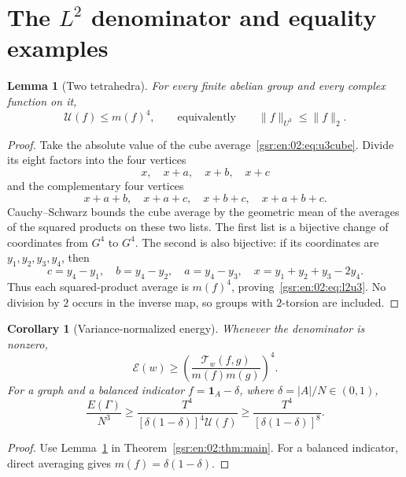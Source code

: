 \documentclass[11pt,letterpaper]{article}
\numberwithin{equation}{section}
\newtheorem{lemma}[theorem]{Lemma}
\newtheorem{corollary}[theorem]{Corollary}
\theoremstyle{definition}
\theoremstyle{remark}
\newcommand{\one}{\mathbf 1}
\newcommand{\1}{\mathbf 1}
\newcommand{\U}{\mathcal U}
\newcommand{\calE}{\mathcal E}
\newcommand{\calT}{\mathcal T}
\newcommand{\srctag}[1]{\texorpdfstring{\enspace\textup{[#1]}}{ [#1]}}
\newcommand{\srcnote}[2]{\par\noindent{\small\textit{Source #1, delivered #2.}}\par}
\begin{document}
\section[{\texorpdfstring{The $L^2$ denominator and equality examples}{The L2 denominator and equality examples}\srctag{02}}]{The $L^2$ denominator and equality examples}\label{gsr:en:02:sec:d4}\label{gsr:en:02:sec:sharp}
\srcnote{02}{Section 4}

\begin{lemma}[Two tetrahedra]\label{gsr:en:02:lem:l2}
For every finite abelian group and every complex function on it,
\begin{equation}\label{gsr:en:02:eq:l2u3}
 \U(f)\leq m(f)^4,\qquad\text{equivalently}\qquad
 \|f\|_{U^3}\leq\|f\|_2.
\end{equation}
\end{lemma}
\begin{proof}
Take the absolute value of the cube average~\eqref{gsr:en:02:eq:u3cube}. Divide its eight factors into the four vertices
\[
 x,\quad x+a,\quad x+b,\quad x+c
\]
and the complementary four vertices
\[
 x+a+b,\quad x+a+c,\quad x+b+c,\quad x+a+b+c.
\]
Cauchy--Schwarz bounds the cube average by the geometric mean of the averages of the squared products on these two lists. The first list is a bijective change of coordinates from $G^4$ to $G^4$. The second is also bijective: if its coordinates are $y_1,y_2,y_3,y_4$, then
\[
 c=y_4-y_1,\quad b=y_4-y_2,\quad a=y_4-y_3,
 \quad x=y_1+y_2+y_3-2y_4.
\]
Thus each squared-product average is $m(f)^4$, proving~\eqref{gsr:en:02:eq:l2u3}. No division by $2$ occurs in the inverse map, so groups with $2$-torsion are included.
\end{proof}

\begin{corollary}[Variance-normalized energy]\label{gsr:en:02:cor:variance}
Whenever the denominator is nonzero,
\[
 \calE(w)\geq
 \left(\frac{\calT_w(f,g)}{m(f)m(g)}\right)^4.
\]
For a graph and a balanced indicator $f=\one_A-\delta$, where $\delta=|A|/N\in(0,1)$,
\begin{equation}\label{gsr:en:02:eq:balancedenergy}
 \boxed{\quad
 \frac{E(\Gamma)}{N^3}
 \geq\frac{T^4}{[\delta(1-\delta)]^4\U(f)}
 \geq\frac{T^4}{[\delta(1-\delta)]^8}.
 \quad}
\end{equation}
\end{corollary}
\begin{proof}
Use Lemma~\ref{gsr:en:02:lem:l2} in Theorem~\ref{gsr:en:02:thm:main}. For a balanced indicator, direct averaging gives $m(f)=\delta(1-\delta)$.
\end{proof}
\end{document}
